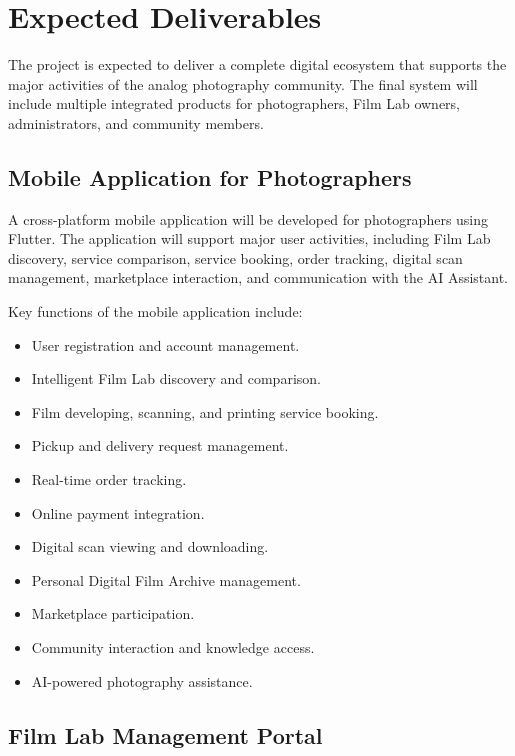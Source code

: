 
\section{Expected Deliverables}

The project is expected to deliver a complete digital ecosystem that supports the major activities of the analog photography community. The final system will include multiple integrated products for photographers, Film Lab owners, administrators, and community members.

\subsection{Mobile Application for Photographers}

A cross-platform mobile application will be developed for photographers using Flutter. The application will support major user activities, including Film Lab discovery, service comparison, service booking, order tracking, digital scan management, marketplace interaction, and communication with the AI Assistant.

Key functions of the mobile application include:

\begin{itemize}
    \item User registration and account management.
    \item Intelligent Film Lab discovery and comparison.
    \item Film developing, scanning, and printing service booking.
    \item Pickup and delivery request management.
    \item Real-time order tracking.
    \item Online payment integration.
    \item Digital scan viewing and downloading.
    \item Personal Digital Film Archive management.
    \item Marketplace participation.
    \item Community interaction and knowledge access.
    \item AI-powered photography assistance.
\end{itemize}

\subsection{Film Lab Management Portal}


